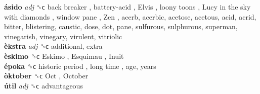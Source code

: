 \textbf{ásido} \emph{adj}  ␝ϲ   back breaker ,  battery-acid ,  Elvis ,  loony toons ,  Lucy in the sky with diamonds ,  window pane ,  Zen , acerb, acerbic, acetose, acetous, acid, acrid, bitter, blistering, caustic, dose, dot, pane, sulfurous, sulphurous, superman, vinegarish, vinegary, virulent, vitriolic  \\
\textbf{èkstra} \emph{adj}  ␝ϲ  additional, extra  \\
\textbf{èskimo} ␝ϲ   Eskimo ,  Esquimau ,  Inuit   \\
\textbf{époka} ␝ϲ   historic period ,  long time , age, years  \\
\textbf{òktober} ␝ϲ   Oct ,  October   \\
\textbf{útil} \emph{adj}  ␝ϲ  advantageous  \\
